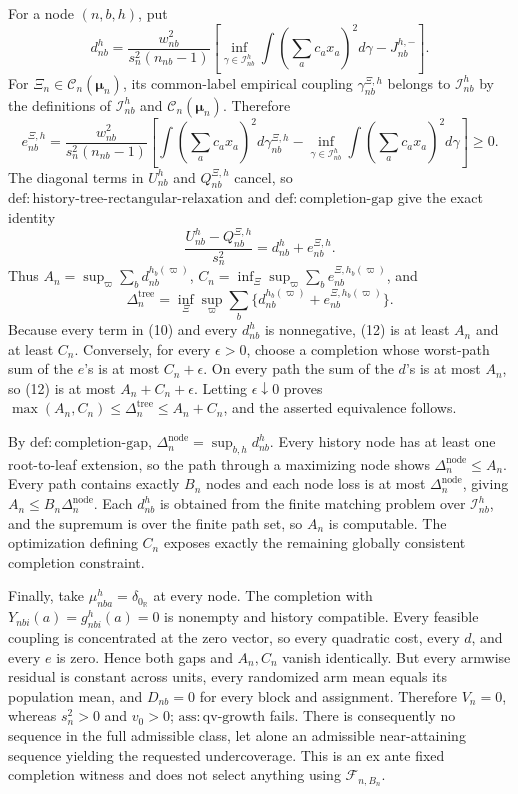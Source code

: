 For a node \((n,b,h)\), put
\[
 d_{nb}^h=\frac{w_{nb}^2}{s_n^2(n_{nb}-1)}\left[
 \inf_{\gamma\in\mathcal I_{nb}^h}\int\left(\sum_ac_ax_a\right)^2d\gamma-J_{nb}^{h,-}\right].
\]
For \(\Xi_n\in\mathcal C_n(\boldsymbol\mu_n)\), its common-label empirical coupling \(\gamma_{nb}^{\Xi,h}\) belongs to \(\mathcal I_{nb}^h\) by the definitions of \(\mathcal I_{nb}^h\) and \(\mathcal C_n(\boldsymbol\mu_n)\).  Therefore
\[
 e_{nb}^{\Xi,h}=\frac{w_{nb}^2}{s_n^2(n_{nb}-1)}\left[
 \int\left(\sum_ac_ax_a\right)^2d\gamma_{nb}^{\Xi,h}
 -\inf_{\gamma\in\mathcal I_{nb}^h}\int\left(\sum_ac_ax_a\right)^2d\gamma\right]\ge0. \tag{10}
\]
The diagonal terms in \(U_{nb}^h\) and \(Q_{nb}^{\Xi,h}\) cancel, so \(\mathrm{def:history\text{-}tree\text{-}rectangular\text{-}relaxation}\) and \(\mathrm{def:completion\text{-}gap}\) give the exact identity
\[
 \frac{U_{nb}^h-Q_{nb}^{\Xi,h}}{s_n^2}=d_{nb}^h+e_{nb}^{\Xi,h}. \tag{11}
\]
Thus \(A_n=\sup_\varpi\sum_bd_{nb}^{h_b(\varpi)}\), \(C_n=\inf_\Xi\sup_\varpi\sum_be_{nb}^{\Xi,h_b(\varpi)}\), and
\[
 \Delta_n^{\mathrm{tree}}=\inf_\Xi\sup_\varpi\sum_b\{d_{nb}^{h_b(\varpi)}+e_{nb}^{\Xi,h_b(\varpi)}\}. \tag{12}
\]
Because every term in (10) and every \(d_{nb}^h\) is nonnegative, (12) is at least \(A_n\) and at least \(C_n\).  Conversely, for every \(\epsilon>0\), choose a completion whose worst-path sum of the \(e\)'s is at most \(C_n+\epsilon\).  On every path the sum of the \(d\)'s is at most \(A_n\), so (12) is at most \(A_n+C_n+\epsilon\).  Letting \(\epsilon\downarrow0\) proves
\(\max(A_n,C_n)\le\Delta_n^{\mathrm{tree}}\le A_n+C_n\), and the asserted equivalence follows.

By \(\mathrm{def:completion\text{-}gap}\), \(\Delta_n^{\mathrm{node}}=\sup_{b,h}d_{nb}^h\).  Every history node has at least one root-to-leaf extension, so the path through a maximizing node shows \(\Delta_n^{\mathrm{node}}\le A_n\).  Every path contains exactly \(B_n\) nodes and each node loss is at most \(\Delta_n^{\mathrm{node}}\), giving \(A_n\le B_n\Delta_n^{\mathrm{node}}\).  Each \(d_{nb}^h\) is obtained from the finite matching problem over \(\mathcal I_{nb}^h\), and the supremum is over the finite path set, so \(A_n\) is computable.  The optimization defining \(C_n\) exposes exactly the remaining globally consistent completion constraint.

Finally, take \(\mu_{nba}^h=\delta_{0_{\mathbb R}}\) at every node.  The completion with \(Y_{nbi}(a)=g_{nbi}^h(a)=0\) is nonempty and history compatible.  Every feasible coupling is concentrated at the zero vector, so every quadratic cost, every \(d\), and every \(e\) is zero.  Hence both gaps and \(A_n,C_n\) vanish identically.  But every armwise residual is constant across units, every randomized arm mean equals its population mean, and \(D_{nb}=0\) for every block and assignment.  Therefore \(V_n=0\), whereas \(s_n^2>0\) and \(v_0>0\); \(\mathrm{ass:qv\text{-}growth}\) fails.  There is consequently no sequence in the full admissible class, let alone an admissible near-attaining sequence yielding the requested undercoverage.  This is an ex ante fixed completion witness and does not select anything using \(\mathcal F_{n,B_n}\).